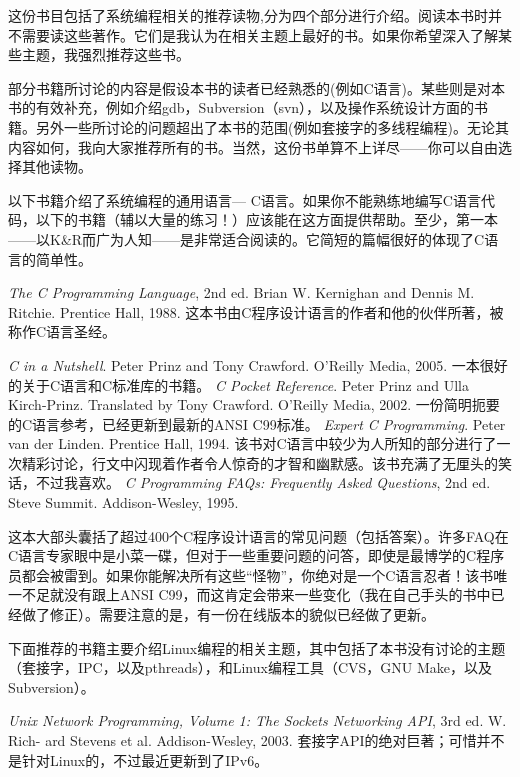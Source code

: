 这份书目包括了系统编程相关的推荐读物,分为四个部分进行介绍。阅读本书时并不需要读这些著作。它们是我认为在相关主题上最好的书。如果你希望深入了解某些主题，我强烈推荐这些书。

部分书籍所讨论的内容是假设本书的读者已经熟悉的(例如C语言)。某些则是对本书的有效补充，例如介绍gdb，Subversion（svn），以及操作系统设计方面的书籍。另外一些所讨论的问题超出了本书的范围(例如套接字的多线程编程)。无论其内容如何，我向大家推荐所有的书。当然，这份书单算不上详尽——你可以自由选择其他读物。

以下书籍介绍了系统编程的通用语言--- C语言。如果你不能熟练地编写C语言代码，以下的书籍（辅以大量的练习！）应该能在这方面提供帮助。至少，第一本——以K\&R而广为人知——是非常适合阅读的。它简短的篇幅很好的体现了C语言的简单性。

\textit{The C Programming Language}, 2nd ed. Brian W. Kernighan and Dennis M. Ritchie.
    Prentice Hall, 1988.
    这本书由C程序设计语言的作者和他的伙伴所著，被称作C语言圣经。

\textit{C in a Nutshell}. Peter Prinz and Tony Crawford. O’Reilly Media, 2005.
    一本很好的关于C语言和C标准库的书籍。
\textit{C Pocket Reference}. Peter Prinz and Ulla Kirch-Prinz. Translated by Tony Crawford.
    O’Reilly Media, 2002.
    一份简明扼要的C语言参考，已经更新到最新的ANSI C99标准。
\textit{Expert C Programming}. Peter van der Linden. Prentice Hall, 1994.
    该书对C语言中较少为人所知的部分进行了一次精彩讨论，行文中闪现着作者令人惊奇的才智和幽默感。该书充满了无厘头的笑话，不过我喜欢。
\textit{C Programming FAQs: Frequently Asked Questions}, 2nd ed. Steve Summit. Addison-Wesley, 1995.
    
    这本大部头囊括了超过400个C程序设计语言的常见问题（包括答案）。许多FAQ在C语言专家眼中是小菜一碟，但对于一些重要问题的问答，即使是最博学的C程序员都会被雷到。如果你能解决所有这些“怪物”，你绝对是一个C语言忍者！该书唯一不足就没有跟上ANSI C99，而这肯定会带来一些变化（我在自己手头的书中已经做了修正）。需要注意的是，有一份在线版本的貌似已经做了更新。

下面推荐的书籍主要介绍Linux编程的相关主题，其中包括了本书没有讨论的主题（套接字，IPC，以及pthreads），和Linux编程工具（CVS，GNU Make，以及Subversion）。

\textit{Unix Network Programming, Volume 1: The Sockets Networking API}, 3rd ed. W. Rich-
    ard Stevens et al. Addison-Wesley, 2003.
    套接字API的绝对巨著；可惜并不是针对Linux的，不过最近更新到了IPv6。

